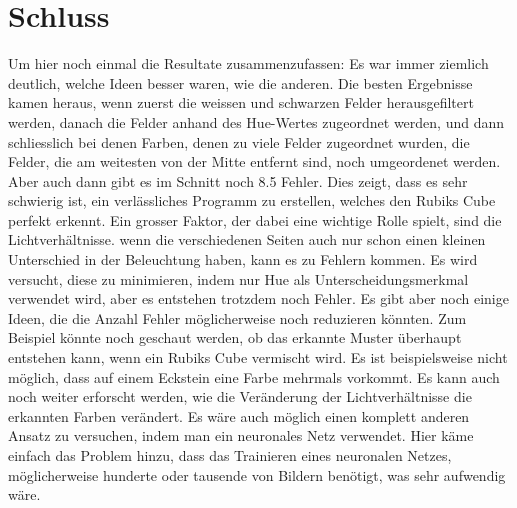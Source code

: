 \documentclass[a4paper, 12pt]{article}
\begin{document}
\section{Schluss}
Um hier noch einmal die Resultate zusammenzufassen: Es war immer ziemlich deutlich, welche Ideen besser waren, wie die anderen. Die besten Ergebnisse kamen heraus, wenn zuerst die weissen und schwarzen Felder herausgefiltert werden, danach die Felder anhand des Hue-Wertes zugeordnet werden, und dann schliesslich bei denen Farben, denen zu viele Felder zugeordnet wurden, die Felder, die am weitesten von der Mitte entfernt sind, noch umgeordenet werden. Aber auch dann gibt es im Schnitt noch 8.5 Fehler. Dies zeigt, dass es sehr schwierig ist, ein verlässliches Programm zu erstellen, welches den Rubiks Cube perfekt erkennt. Ein grosser Faktor, der dabei eine wichtige Rolle spielt, sind die Lichtverhältnisse. wenn die verschiedenen Seiten auch nur schon einen kleinen Unterschied in der Beleuchtung haben, kann es zu Fehlern kommen. Es wird versucht, diese zu minimieren, indem nur Hue als Unterscheidungsmerkmal verwendet wird, aber es entstehen trotzdem noch Fehler. Es gibt aber noch einige Ideen, die die Anzahl Fehler möglicherweise noch reduzieren könnten. Zum Beispiel könnte noch geschaut werden, ob das erkannte Muster überhaupt entstehen kann, wenn ein Rubiks Cube vermischt wird. Es ist beispielsweise nicht möglich, dass auf einem Eckstein eine Farbe mehrmals vorkommt. Es kann auch noch weiter erforscht werden, wie die Veränderung der Lichtverhältnisse die erkannten Farben verändert. Es wäre auch möglich einen komplett anderen Ansatz zu versuchen, indem man ein neuronales Netz verwendet. Hier käme einfach das Problem hinzu, dass das Trainieren eines neuronalen Netzes, möglicherweise hunderte oder tausende von Bildern benötigt, was sehr aufwendig wäre. 
\end{document}
